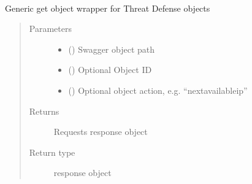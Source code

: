 \documentclass[letterpaper,10pt,english]{sphinxmanual}
\begin{document}
\begin{fulllineitems}
\label{\detokenize{b1tddfp-class:bloxone.b1tddfp}}~

\begin{fulllineitems}
\label{\detokenize{b1tddfp-class:bloxone.b1tddfp.get}}
\sphinxAtStartPar
Generic get object wrapper for Threat Defense objects
\begin{quote}\begin{description}
\item[{Parameters}] \leavevmode\begin{itemize}
\item {} 
\sphinxAtStartPar
{} () \textendash{} Swagger object path

\item {} 
\sphinxAtStartPar
{} () \textendash{} Optional Object ID

\item {} 
\sphinxAtStartPar
{} () \textendash{} Optional object action, e.g. “nextavailableip”

\end{itemize}

\item[{Returns}] \leavevmode
\sphinxAtStartPar
Requests response object

\item[{Return type}] \leavevmode
\sphinxAtStartPar
response object

\end{description}\end{quote}

\end{fulllineitems}


\end{fulllineitems}
\end{document}
